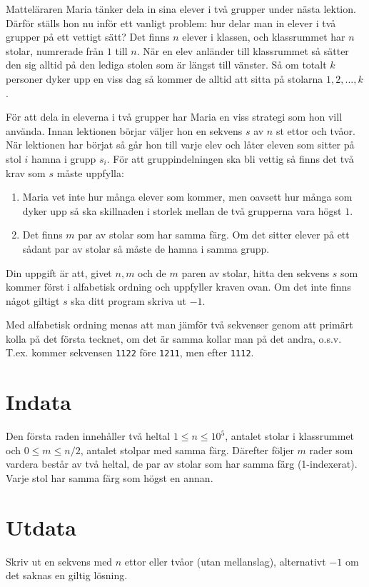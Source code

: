 Matteläraren Maria tänker dela in sina elever i två grupper under nästa lektion.
Därför ställs hon nu inför ett vanligt problem: hur delar man in elever i två grupper på ett vettigt sätt?
Det finns $n$ elever i klassen, och klassrummet har $n$ stolar, numrerade från $1$ till $n$.
När en elev anländer till klassrummet så sätter den sig alltid på den lediga stolen som är längst till vänster.
Så om totalt $k$ personer dyker upp en viss dag så kommer de alltid att sitta på stolarna $1,2,...,k$.

För att dela in eleverna i två grupper har Maria en viss strategi som hon vill använda.
Innan lektionen börjar väljer hon en sekvens $s$ av $n$ st ettor och tvåor.
När lektionen har börjat så går hon till varje elev och låter eleven som sitter på stol $i$ hamna i grupp $s_i$.
För att gruppindelningen ska bli vettig så finns det två krav som $s$ måste uppfylla:

\begin{enumerate}
  \item Maria vet inte hur många elever som kommer, men oavsett hur många som dyker upp så ska skillnaden i storlek mellan de två grupperna vara högst $1$.

  \item Det finns $m$ par av stolar som har samma färg. Om det sitter elever på ett sådant par av stolar så måste de hamna i samma grupp.
\end{enumerate}

Din uppgift är att, givet $n,m$ och de $m$ paren av stolar, hitta den sekvens $s$ som kommer först i alfabetisk ordning och uppfyller kraven ovan.
Om det inte finns något giltigt $s$ ska ditt program skriva ut $-1$.

Med alfabetisk ordning menas att man jämför två sekvenser genom att primärt kolla på det första tecknet, om det är samma kollar man på det andra, o.s.v.
T.ex. kommer sekvensen \texttt{1122} före \texttt{1211}, men efter \texttt{1112}.

\section*{Indata}
Den första raden innehåller två heltal $1\leq n \leq 10^5$, antalet stolar i klassrummet och $0\leq m \leq n/2$, antalet stolpar med samma färg.
Därefter följer $m$ rader som vardera består av två heltal, de par av stolar som har samma färg (1-indexerat).
Varje stol har samma färg som högst en annan.

\section*{Utdata}
Skriv ut en sekvens med $n$ ettor eller tvåor (utan mellanslag), alternativt $-1$ om det saknas en giltig lösning.

